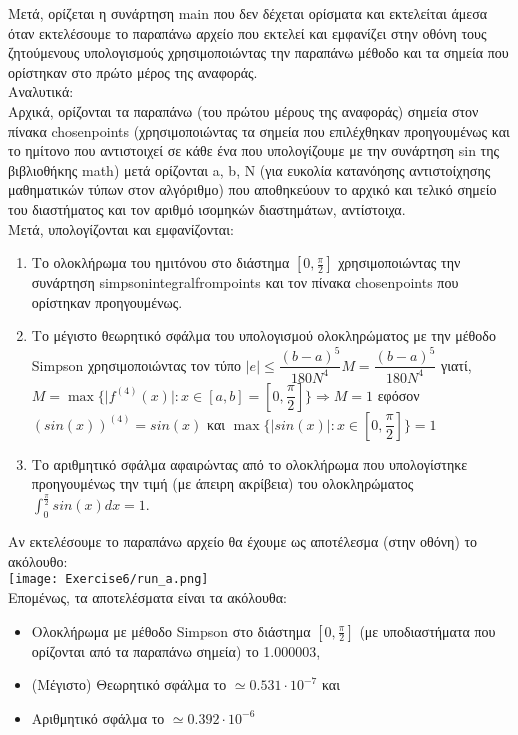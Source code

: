 \documentclass[a4paper,11pt]{article}
\newcommand{\lt}{\latintext}
\begin{document}
\par
Μετά, ορίζεται η συνάρτηση {\lt main} που δεν δέχεται ορίσματα και εκτελείται άμεσα όταν εκτελέσουμε το παραπάνω αρχείο που εκτελεί και εμφανίζει στην οθόνη τους ζητούμενους υπολογισμούς χρησιμοποιώντας την παραπάνω μέθοδο και τα σημεία που ορίστηκαν στο πρώτο μέρος της αναφοράς.\\
Αναλυτικά:\\
Αρχικά, ορίζονται τα παραπάνω (του πρώτου μέρους της αναφοράς) σημεία στον πίνακα {\lt chosen\textunderscore points} (χρησιμοποιώντας τα σημεία που επιλέχθηκαν προηγουμένως και το ημίτονο που αντιστοιχεί σε κάθε ένα που υπολογίζουμε με την συνάρτηση {\lt sin} της βιβλιοθήκης {\lt math}) μετά ορίζονται {\lt a, b, N} (για ευκολία κατανόησης αντιστοίχησης μαθηματικών τύπων στον αλγόριθμο) που αποθηκεύουν το αρχικό και τελικό σημείο του διαστήματος και τον αριθμό ισομηκών διαστημάτων, αντίστοιχα.\\
Μετά, υπολογίζονται και εμφανίζονται:
\begin{enumerate}
    \item Το ολοκλήρωμα του ημιτόνου στο διάστημα $[0, \frac{\pi}{2}]$ χρησιμοποιώντας την συνάρτηση {\lt simpson\textunderscore integral\textunderscore from\textunderscore points} και τον πίνακα {\lt chosen\textunderscore points} που ορίστηκαν προηγουμένως.
    \item Το μέγιστο θεωρητικό σφάλμα του υπολογισμού ολοκληρώματος με την μέθοδο {\lt Simpson} χρησιμοποιώντας τον τύπο {\lt $\lvert e\rvert \leq \dfrac{(b-a)^5}{180N^4}M = \dfrac{(b-a)^5}{180N^4}$} γιατί, {\lt $M = \max\{ \lvert f^{(4)}(x)\rvert : x \in [a, b] = [0, \dfrac{\pi}{2}]\} \Longrightarrow M = 1$} εφόσον {\lt $(sin(x))^{(4)} = sin(x)$} και {\lt $\max\{ \lvert sin(x)\rvert : x \in [0, \dfrac{\pi}{2}]\} = 1$ }
    \item Το αριθμητικό σφάλμα αφαιρώντας από το ολοκλήρωμα που υπολογίστηκε προηγουμένως την τιμή (με άπειρη ακρίβεια) του ολοκληρώματος {\lt $\int_{0}^{\frac{\pi}{2}}sin(x)dx = 1$}.
\end{enumerate}

\par
Αν εκτελέσουμε το παραπάνω αρχείο θα έχουμε ως αποτέλεσμα (στην οθόνη) το ακόλουθο:\\
\texttt{[image: Exercise6/run\_a.png]}\\

Επομένως, τα αποτελέσματα είναι τα ακόλουθα:
\begin{itemize}
    \item Ολοκλήρωμα με μέθοδο {\lt Simpson} στο διάστημα $[0, \frac{\pi}{2}]$ (με υποδιαστήματα που ορίζονται από τα παραπάνω σημεία) το 1.000003,
    \item (Μέγιστο) Θεωρητικό σφάλμα το $\simeq 0.531\cdot 10^{-7}$ και
    \item Αριθμητικό σφάλμα το $\simeq 0.392\cdot 10^{-6}$
\end{itemize}
\end{document}
